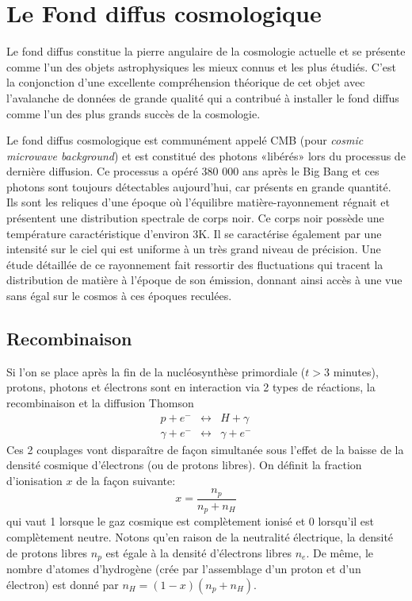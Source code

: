 
\chapter{Le Fond diffus cosmologique}

Le fond diffus constitue la pierre angulaire de la cosmologie actuelle et se présente comme l'un des objets astrophysiques les mieux connus et les plus étudiés. C'est la conjonction d'une excellente compréhension théorique de cet objet avec l'avalanche de données de grande qualité qui a contribué à installer le fond diffus comme l'un des plus grands succès de la cosmologie.

Le fond diffus cosmologique est communément appelé CMB (pour \textit{cosmic microwave background}) et est constitué des photons «libérés» lors du processus de dernière diffusion. Ce processus a opéré 380 000 ans après le Big Bang et ces photons sont toujours détectables aujourd'hui, car présents en grande quantité. Ils sont les reliques d'une époque où l'équilibre matière-rayonnement régnait et présentent une distribution spectrale de corps noir. Ce corps noir possède une température caractéristique d'environ 3K. Il se caractérise également par une intensité sur le ciel qui est uniforme à un très grand niveau de précision. Une étude détaillée de ce rayonnement fait ressortir des fluctuations qui tracent la distribution de matière à l'époque de son émission, donnant ainsi accès à une vue sans égal sur le cosmos à ces époques reculées.

\section{Recombinaison}
Si l'on se place après la fin de la nucléosynthèse primordiale ($t>3$ minutes), protons, photons et électrons sont en interaction via 2 types de réactions, la recombinaison et la diffusion Thomson
\begin{eqnarray}
p + e^- &\leftrightarrow& H+ \gamma\label{e:rec}\\
\gamma +e^- &\leftrightarrow& \gamma +e^- 
\end{eqnarray}
Ces 2 couplages vont disparaître de façon simultanée sous l'effet de la baisse de la densité cosmique d'électrons (ou de protons libres). On définit la fraction d'ionisation $x$ de la façon suivante:
\begin{equation}
x=\frac{n_p}{n_p+n_H}
\end{equation} 
qui vaut 1 lorsque le gaz cosmique est complètement ionisé et 0 lorsqu'il est complètement neutre. Notons qu'en raison de la neutralité électrique, la densité de protons libres $n_p$ est égale à la densité d'électrons libres $n_e$. De même, le nombre d'atomes d'hydrogène (crée par l'assemblage d'un proton et d'un électron) est donné par $n_H=(1-x) (n_p+n_H)$. 

